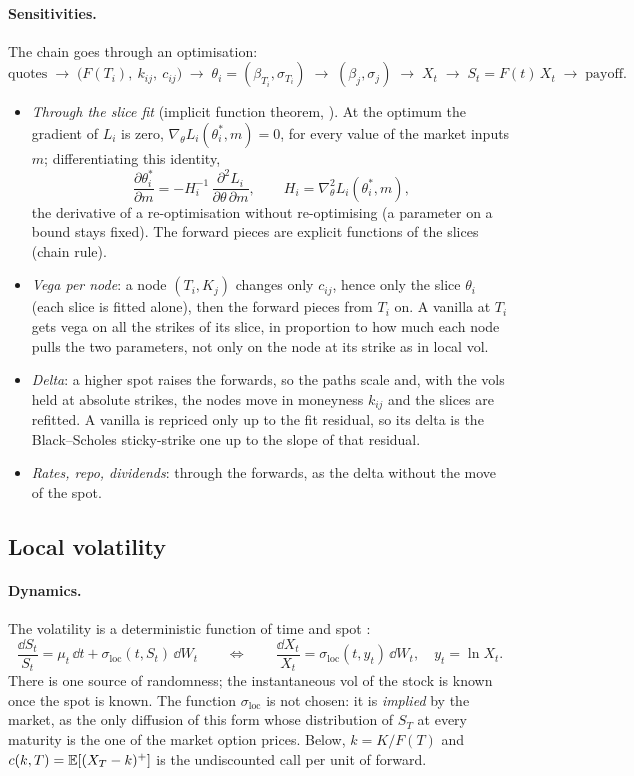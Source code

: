 \paragraph{Sensitivities.} The chain goes through an optimisation:
\[
  \text{quotes} \;\to\; \big(F(T_i),\ k_{ij},\ c_{ij}\big) \;\to\; \theta_i = (\beta_{T_i}, \sigma_{T_i}) \;\to\; (\beta_j, \sigma_j) \;\to\; X_t \;\to\; S_t = F(t)\,X_t \;\to\; \text{payoff}.
\]
\begin{itemize}[nosep]
  \item \emph{Through the slice fit} (implicit function theorem, \citealp{henrard2011}). At the optimum the gradient of $L_i$ is
        zero, $\nabla_\theta L_i(\theta_i^*, m) = 0$, for every value of the market inputs $m$; differentiating this identity,
        \[
          \frac{\partial\theta_i^*}{\partial m} = -H_i^{-1}\,\frac{\partial^2 L_i}{\partial\theta\,\partial m},\qquad H_i = \nabla^2_\theta L_i(\theta_i^*, m),
        \]
        the derivative of a re-optimisation without re-optimising (a parameter on a bound stays fixed). The forward
        pieces are explicit functions of the slices (chain rule).
  \item \emph{Vega per node}: a node $(T_i, K_j)$ changes only $c_{ij}$, hence only the slice $\theta_i$ (each slice is fitted
        alone), then the forward pieces from $T_i$ on. A vanilla at $T_i$ gets vega on all the strikes of its slice, in
        proportion to how much each node pulls the two parameters, not only on the node at its strike as in local vol.
  \item \emph{Delta}: a higher spot raises the forwards, so the paths scale and, with the vols held at absolute strikes,
        the nodes move in moneyness $k_{ij}$ and the slices are refitted. A vanilla is repriced only up to the fit
        residual, so its delta is the Black--Scholes sticky-strike one up to the slope of that residual.
  \item \emph{Rates, repo, dividends}: through the forwards, as the delta without the move of the spot.
\end{itemize}

\subsection{Local volatility}\label{sec:mp-lv}
\paragraph{Dynamics.} The volatility is a deterministic function of time and spot \citep{dupire1994,derman1994}:
\[
  \frac{\dd S_t}{S_t} = \mu_t\,\dd t + \sigma_{\mathrm{loc}}(t, S_t)\,\dd W_t
  \qquad\Longleftrightarrow\qquad
  \frac{\dd X_t}{X_t} = \sigma_{\mathrm{loc}}(t, y_t)\,\dd W_t,\quad y_t = \ln X_t .
\]
There is one source of randomness; the instantaneous vol of the stock is known once the spot is known. The function
$\sigma_{\mathrm{loc}}$ is not chosen: it is \emph{implied} by the market, as the only diffusion of this form whose distribution of
$S_T$ at every maturity is the one of the market option prices. Below, $k = K/F(T)$ and $c(k, T) = \mathbb{E}[(X_T - k)^+]$ is the
undiscounted call per unit of forward.

